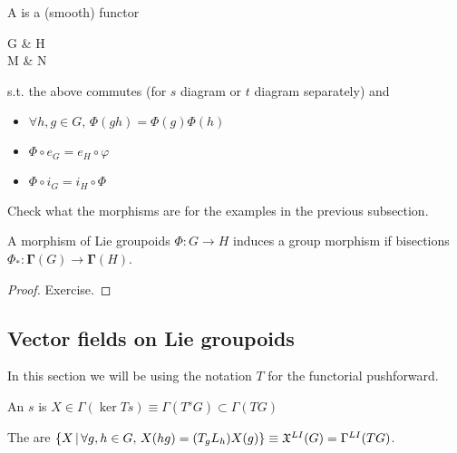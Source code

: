 \documentclass{article}
\begin{document}
\begin{definition}
A  is a (smooth) functor 
\begin{tkz}
G \arrow[r,"\Phi"]   & H   \\
M \arrow[r,"\varphi"'] & N
\end{tkz}
s.t. the above commutes (for $s$ diagram or $t$ diagram separately) and 
\begin{itemize}
    \item $\forall h,g \in G, \, \Phi(gh) = \Phi(g) \Phi(h)$ 
    \item $\Phi \circ e_G = e_H \circ \varphi$
    \item $\Phi \circ i_G = i_H \circ \Phi$
\end{itemize}
\end{definition}

\begin{ex}
Check what the morphisms are for the examples in the previous subsection. 
\end{ex}

\begin{prop}
A morphism of Lie groupoids $\Phi:G \to H$ induces a group morphism if bisections $\Phi_\ast : \bm{\Gamma}(G) \to \bm{\Gamma}(H)$. 
\end{prop}
\begin{proof}
Exercise. 
\end{proof}

\subsection{Vector fields on Lie groupoids}

\begin{remark}
In this section we will be using the notation $T$ for the functorial pushforward. 
\end{remark}

\begin{definition}
An $s$ is $X \in \Gamma(\ker Ts) \equiv \Gamma(T^sG)\subset \Gamma(TG)$
\end{definition}

\begin{definition}
The  are $\left\{ X \, | \,  \forall g,h \in G, \, X(hg) = (T_g L_h) X(g) \right\} \equiv \mathfrak{X}^{LI}(G) = \Gamma^{LI}(TG)$. 
\end{definition}
\end{document}
